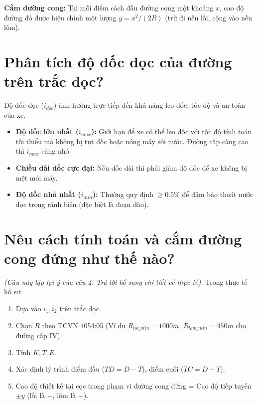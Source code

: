 \documentclass[12pt,a4paper]{article}
\begin{document}
\textbf{Cắm đường cong:} Tại mỗi điểm cách đầu đường cong một khoảng $x$, cao độ đường đỏ được hiệu chỉnh một lượng $y = x^2 / (2R)$ (trừ đi nếu lồi, cộng vào nếu lõm).

\section{Phân tích độ dốc dọc của đường trên trắc dọc?}
Độ dốc dọc ($i_{doc}$) ảnh hưởng trực tiếp đến khả năng leo dốc, tốc độ và an toàn của xe.
\begin{itemize}
    \item \textbf{Độ dốc lớn nhất ($i_{max}$):} Giới hạn để xe có thể leo dốc với tốc độ tính toán tối thiểu mà không bị tụt dốc hoặc nóng máy sôi nước. Đường cấp càng cao thì $i_{max}$ càng nhỏ.
    \item \textbf{Chiều dài dốc cực đại:} Nếu dốc dài thì phải giảm độ dốc để xe không bị mệt mỏi máy.
    \item \textbf{Độ dốc nhỏ nhất ($i_{min}$):} Thường quy định $\ge 0.5\%$ để đảm bảo thoát nước dọc trong rãnh biên (đặc biệt là đoạn đào).
\end{itemize}

\section{Nêu cách tính toán và cắm đường cong đứng như thế nào?}
\textit{(Câu này lặp lại ý của câu 4. Trả lời bổ sung chi tiết về thực tế).}
Trong thực tế hồ sơ:
\begin{enumerate}
    \item Dựa vào $i_1, i_2$ trên trắc dọc.
    \item Chọn $R$ theo TCVN 4054:05 (Ví dụ $R_{loi\_min} = 1000m$, $R_{lom\_min} = 450m$ cho đường cấp IV).
    \item Tính $K, T, E$.
    \item Xác định lý trình điểm đầu ($TD = D - T$), điểm cuối ($TC = D + T$).
    \item Cao độ thiết kế tại cọc trong phạm vi đường cong đứng = Cao độ tiếp tuyến $\pm y$ (lồi là $-$, lõm là $+$).
\end{enumerate}
\end{document}
